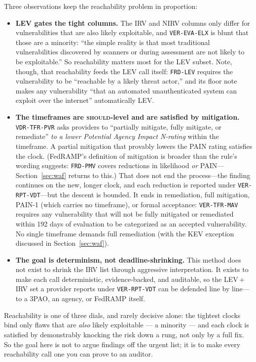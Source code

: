 \documentclass[11pt]{article}
\newcommand{\code}[1]{\texttt{#1}}
\newcommand{\rfckw}[1]{\textsc{#1}}
\begin{document}
Three observations keep the reachability problem in proportion:
\begin{itemize}[leftmargin=1.5em]
\item \textbf{LEV gates the tight columns.} The IRV and NIRV columns only differ for vulnerabilities that are also likely exploitable, and \code{VER-EVA-ELX} is blunt that those are a minority: ``the simple reality is that most traditional vulnerabilities discovered by scanners or during assessment are not likely to be exploitable.'' So reachability matters most for the LEV subset. Note, though, that reachability feeds the LEV call itself: \code{FRD-LEV} requires the vulnerability to be ``reachable by a likely threat actor,'' and its floor note makes any vulnerability ``that an automated unauthenticated system can exploit over the internet'' automatically LEV.
\item \textbf{The timeframes are \rfckw{should}-level and are satisfied by mitigation.} \code{VDR-TFR-PVR} asks providers to ``partially mitigate, fully mitigate, or remediate'' \emph{to a lower Potential Agency Impact N-rating} within the timeframe. A partial mitigation that provably lowers the PAIN rating satisfies the clock. (FedRAMP's definition of mitigation is broader than the rule's wording suggests: \code{FRD-PMV} covers reductions in likelihood \emph{or} PAIN---Section~\ref{sec:waf} returns to this.) That does not end the process---the finding continues on the new, longer clock, and each reduction is reported under \code{VER-RPT-VDT}---but the descent is bounded. It ends in remediation, full mitigation, PAIN-1 (which carries no timeframe), or formal acceptance: \code{VER-TFR-MAV} requires any vulnerability that will not be fully mitigated or remediated within 192 days of evaluation to be categorized as an accepted vulnerability. No single timeframe demands full remediation (with the KEV exception discussed in Section~\ref{sec:waf}).
\item \textbf{The goal is determinism, not deadline-shrinking.} This method does not exist to shrink the IRV list through aggressive interpretation. It exists to make each call deterministic, evidence-backed, and auditable, so the LEV\,+\,IRV set a provider reports under \code{VER-RPT-VDT} can be defended line by line---to a 3PAO, an agency, or FedRAMP itself.
\end{itemize}

\begin{plain}
Reachability is one of three dials, and rarely decisive alone: the tightest clocks bind only flaws that are \emph{also} likely exploitable --- a minority --- and each clock is satisfied by demonstrably knocking the risk down a rung, not only by a full fix. So the goal here is not to argue findings off the urgent list; it is to make every reachability call one you can prove to an auditor.
\end{plain}
\end{document}
